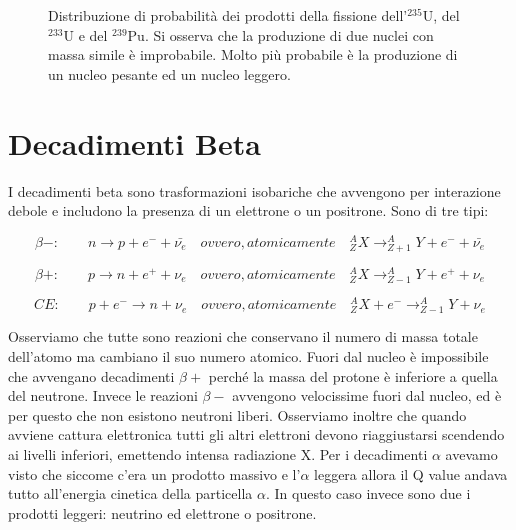\begin{figure}
\centering
		\caption{Distribuzione di probabilità dei prodotti della fissione dell'$^{235}\text{U}$, del $^{233}\text{U}$ e del $^{239}\text{Pu}$. Si osserva che la produzione di due nuclei con massa simile è improbabile. Molto più probabile è la produzione di un nucleo pesante ed un nucleo leggero.}
         \label{fissionyealds}
\end{figure}

\section{Decadimenti Beta}

I decadimenti beta sono trasformazioni isobariche che avvengono per interazione debole e includono la presenza di un elettrone o un positrone. Sono di tre tipi:

\begin{equation}
\beta-: \qquad n \longrightarrow p + e^-+\bar{\nu_e}  \quad ovvero, atomicamente \quad  ^A_ZX \longrightarrow _{Z+1}^AY+e^-+\bar{\nu_e}
\end{equation}


\begin{equation}
\beta+: \qquad p \longrightarrow n + e^++\nu_e \quad ovvero, atomicamente \quad  ^A_ZX \longrightarrow _{Z-1}^AY+e^++\nu_e
\end{equation}


\begin{equation}
CE: \qquad p + e^- \longrightarrow n + \nu_e \quad ovvero, atomicamente \quad  ^A_ZX+e^- \longrightarrow _{Z-1}^AY+\nu_e
\end{equation}

Osserviamo che tutte sono reazioni che conservano il numero di massa totale dell'atomo ma cambiano il suo numero atomico.
Fuori dal nucleo è impossibile che avvengano decadimenti $\beta+$ perché la massa del protone è inferiore a quella del neutrone. Invece le reazioni $\beta-$ avvengono velocissime fuori dal nucleo, ed è per questo che non esistono neutroni liberi.
Osserviamo inoltre che quando avviene cattura elettronica tutti gli altri elettroni devono riaggiustarsi scendendo ai livelli inferiori, emettendo intensa radiazione X.
Per i decadimenti $\alpha$ avevamo visto che siccome c'era un prodotto massivo e l'$\alpha$ leggera allora il Q value andava tutto all'energia cinetica della particella $\alpha$. In questo caso invece sono due i prodotti leggeri: neutrino ed elettrone o positrone.


